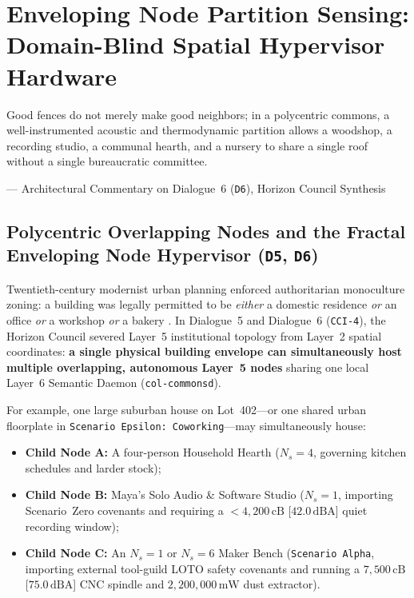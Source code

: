 \chapter{Enveloping Node Partition Sensing: Domain-Blind Spatial Hypervisor Hardware}
\label{ch:enveloping-node-partition-sensing}

\epigraph{Good fences do not merely make good neighbors; in a polycentric commons, a well-instrumented acoustic and thermodynamic partition allows a woodshop, a recording studio, a communal hearth, and a nursery to share a single roof without a single bureaucratic committee.}{--- Architectural Commentary on Dialogue~6 (\texttt{D6}), Horizon Council Synthesis}

\section{Polycentric Overlapping Nodes and the Fractal Enveloping Node Hypervisor (\texttt{D5}, \texttt{D6})}
\label{sec:l2-enveloping-hypervisor-overview}

Twentieth-century modernist urban planning enforced authoritarian monoculture zoning: a building was legally permitted to be \textit{either} a domestic residence \textit{or} an office \textit{or} a workshop \textit{or} a bakery \parencite{scott1998,habraken1972supports}. In Dialogue~5 and Dialogue~6 (\texttt{CCI-4}), the Horizon Council severed Layer~5 institutional topology from Layer~2 spatial coordinates: \textbf{a single physical building envelope can simultaneously host multiple overlapping, autonomous Layer~5 nodes} sharing one local Layer~6 Semantic Daemon (\texttt{col-commonsd}).

For example, one large suburban house on Lot~402---or one shared urban floorplate in \texttt{Scenario Epsilon: Coworking}---may simultaneously house:
\begin{itemize}
    \item \textbf{Child Node A:} A four-person Household Hearth ($N_s = 4$, governing kitchen schedules and larder stock);
    \item \textbf{Child Node B:} Maya's Solo Audio \& Software Studio ($N_s = 1$, importing Scenario~Zero covenants and requiring a $< 4{,}200\,\mathrm{cB}$ [$42.0\,\mathrm{dBA}$] quiet recording window);
    \item \textbf{Child Node C:} An $N_s = 1$ or $N_s = 6$ Maker Bench (\texttt{Scenario Alpha}, importing external tool-guild LOTO safety covenants and running a $7{,}500\,\mathrm{cB}$ [$75.0\,\mathrm{dBA}$] CNC spindle and $2{,}200{,}000\,\mathrm{mW}$ dust extractor).
\end{itemize}

